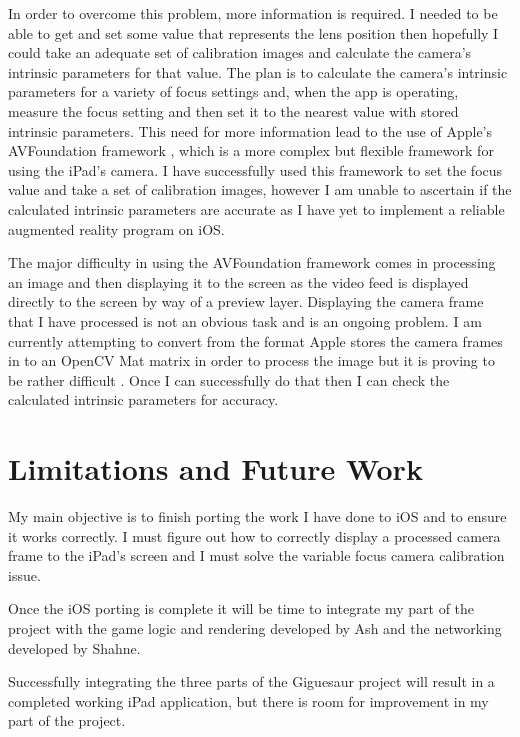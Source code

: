 \documentclass{article}
\begin{document}
In order to overcome this problem, more information is required. I needed to be able to get and set some value that represents the lens position \cite{xamarin} then hopefully I could take an adequate set of calibration images and calculate the camera's intrinsic parameters for that value. The plan is to calculate the camera's intrinsic parameters for a variety of focus settings and, when the app is operating, measure the focus setting and then set it to the nearest value with stored intrinsic parameters. This need for more information lead to the use of Apple's AVFoundation framework \cite{apple_class}, which is a more complex but flexible framework for using the iPad's camera. I have successfully used this framework to set the focus value and take a set of calibration images, however I am unable to ascertain if the calculated intrinsic parameters are accurate as I have yet to implement a reliable augmented reality program on iOS. \par

The major difficulty in using the AVFoundation framework comes in processing an image and then displaying it to the screen as the video feed is displayed directly to the screen by way of a preview layer. Displaying the camera frame that I have processed is not an obvious task and is an ongoing problem. I am currently attempting to convert from the format Apple stores the camera frames in to an OpenCV Mat matrix in order to process the image but it is proving to be rather difficult \cite{stack}. Once I can successfully do that then I can check the calculated intrinsic parameters for accuracy. \par


\section{Limitations and Future Work}

My main objective is to finish porting the work I have done to iOS and to ensure it works correctly. I must figure out how to correctly display a processed camera frame to the iPad's screen and I must solve the variable focus camera calibration issue.

Once the iOS porting is complete it will be time to integrate my part of the project with the game logic and rendering developed by Ash and the networking developed by Shahne. 

Successfully integrating the three parts of the Giguesaur project will result in a completed working iPad application, but there is room for improvement in my part of the project. 
\end{document}
